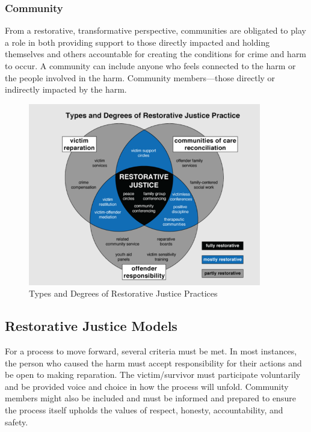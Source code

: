 \documentclass{article}
\begin{document}
\subsubsection*{Community}

From a restorative, transformative perspective, communities are obligated to play a role in both providing support to those directly impacted and holding themselves and others accountable for creating the conditions for crime and harm to occur. A community can include anyone who feels connected to the harm or the people involved in the harm. Community members—those directly or indirectly impacted by the harm.

\begin{figure}
    \begin{center}
        \includegraphics[width = 4in]{Restorative_Justice.png}
    \end{center}
    \caption{Types and Degrees of Restorative Justice Practices \cite{ref: Types and Degrees of Restorative Justice Practice}}
    \label{RestorativeJ}
\end{figure}

\subsection{Restorative Justice Models}

For a process to move forward, several criteria must be met. In most instances, the person who caused the harm must accept responsibility for their actions and be open to making reparation. The victim/survivor must participate voluntarily and be provided voice and choice in how the process will unfold. Community members might also be included and must be informed and prepared to ensure the process itself upholds the values of respect, honesty, accountability, and safety.
\end{document}
